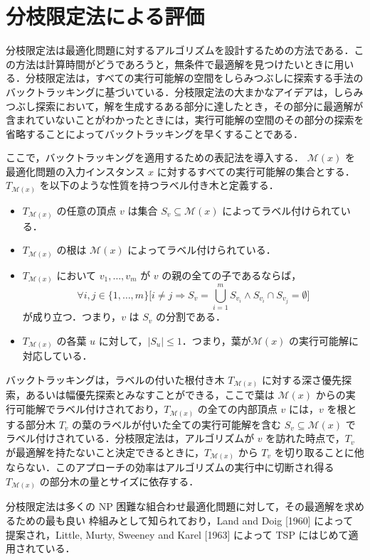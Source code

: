 \documentclass[12pt]{optlab-bachelor}
\begin{document}
\section{分枝限定法による評価}
分枝限定法は最適化問題に対するアルゴリズムを設計するための方法である．この方法は計算時間がどうであろうと，無条件で最適解を見つけたいときに用いる．分枝限定法は，すべての実行可能解の空間をしらみつぶしに探索する手法のバックトラッキングに基づいている．分枝限定法の大まかなアイデアは，しらみつぶし探索において，解を生成するある部分に達したとき，その部分に最適解が含まれていないことがわかったときには，実行可能解の空間のその部分の探索を省略することによってバックトラッキングを早くすることである．

ここで，バックトラッキングを適用するための表記法を導入する．
$\mathcal{M}(x)$ を最適化問題の入力インスタンス $x$ に対するすべての実行可能解の集合とする．$T_{\mathcal{M}(x)}$ を以下のような性質を持つラベル付き木と定義する．
\begin{itemize}
  \item $T_{\mathcal{M}(x)}$ の任意の頂点 $v$ は集合 $S_v \subseteq \mathcal{M}(x)$ によってラベル付けられている．
  \item $T_{\mathcal{M}(x)}$ の根は $\mathcal{M}(x)$ によってラベル付けられている．
  \item $T_{\mathcal{M}(x)}$ において $v_1,\ldots,v_m$ が $v$ の親の全ての子であるならば，$$\forall i,j \in \{1,\ldots,m\}\bigg[i \neq j \Rightarrow S_v = \bigcup_{i = 1}^{m}S_{v_i} \land S_{v_i} \cap S_{v_j} = \emptyset \bigg]$$ が成り立つ．つまり，$v$ は $S_v$ の分割である．
  \item $T_{\mathcal{M}(x)}$ の各葉 $u$ に対して，$|S_u| \le 1$．つまり，葉が$\mathcal{M}(x)$ の実行可能解に対応している．
\end{itemize}

バックトラッキングは，ラベルの付いた根付き木 $T_{\mathcal{M}(x)}$ に対する深さ優先探索，あるいは幅優先探索とみなすことができる，ここで葉は $\mathcal{M}(x)$ からの実行可能解でラベル付けされており，$T_{\mathcal{M}(x)}$ の全ての内部頂点 $v$ には，$v$ を根とする部分木 $T_v$ の葉のラベルが付いた全ての実行可能解を含む $S_v \subseteq \mathcal{M}(x)$ でラベル付けされている．分枝限定法は，アルゴリズムが $v$ を訪れた時点で，$T_v$ が最適解を持たないこと決定できるときに，$T_{\mathcal{M}(x)}$ から $T_v$ を切り取ることに他ならない．このアプローチの効率はアルゴリズムの実行中に切断され得る $T_{\mathcal{M}(x)}$ の部分木の量とサイズに依存する．

分枝限定法は多くの NP 困難な組合わせ最適化問題に対して，その最適解を求めるための最も良い
枠組みとして知られており，Land and Doig [1960] \cite{BandB} によって
提案され，Little, Murty, Sweeney and Karel [1963] \cite{BandB2}
によって TSP にはじめて適用されている．
\end{document}
